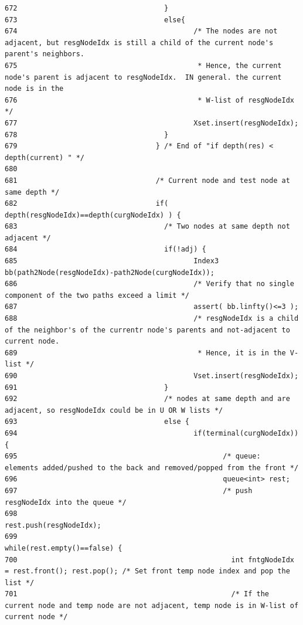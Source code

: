\begin{verbatim}
672                                   }
673                                   else{
674                                          /* The nodes are not adjacent, but resgNodeIdx is still a child of the current node's parent's neighbors.
675                                           * Hence, the current node's parent is adjacent to resgNodeIdx.  IN general. the current node is in the
676                                           * W-list of resgNodeIdx */
677                                          Xset.insert(resgNodeIdx);
678                                   }
679                                 } /* End of "if depth(res) < depth(current) " */
680                                 
681                                 /* Current node and test node at same depth */
682                                 if( depth(resgNodeIdx)==depth(curgNodeIdx) ) {
683                                   /* Two nodes at same depth not adjacent */
684                                   if(!adj) {
685                                          Index3 bb(path2Node(resgNodeIdx)-path2Node(curgNodeIdx));
686                                          /* Verify that no single component of the two paths exceed a limit */
687                                          assert( bb.linfty()<=3 );
688                                          /* resgNodeIdx is a child of the neighbor's of the currentr node's parents and not-adjacent to current node.
689                                           * Hence, it is in the V-list */
690                                          Vset.insert(resgNodeIdx);
691                                   }
692                                   /* nodes at same depth and are adjacent, so resgNodeIdx could be in U OR W lists */
693                                   else {
694                                          if(terminal(curgNodeIdx)) {
695                                                 /* queue:  elements added/pushed to the back and removed/popped from the front */ 
696                                                 queue<int> rest;
697                                                 /* push resgNodeIdx into the queue */
698                                                 rest.push(resgNodeIdx);
699                                                 while(rest.empty()==false) {
700                                                   int fntgNodeIdx = rest.front(); rest.pop(); /* Set front temp node index and pop the list */
701                                                   /* If the current node and temp node are not adjacent, temp node is in W-list of current node */

\end{verbatim}
